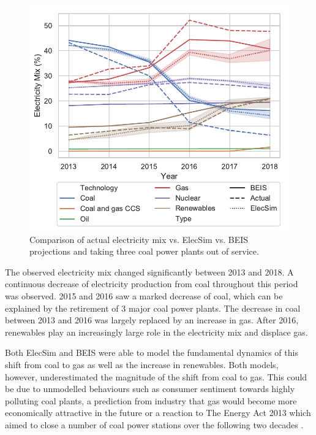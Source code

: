 \begin{figure}
	\centering
	\includegraphics[width=0.7\columnwidth]{Chapter4/figures/e-Energy-2020/results/throughout_years_beis_elecsim_comparison_coal_dropout_leg_below.pdf}
	\caption{Comparison of actual electricity mix vs. ElecSim vs. BEIS projections and taking three coal power plants out of service.}
	\label{elecsim:fig:beis_elecsim_historic_comparison}
\end{figure}

The observed electricity mix changed significantly between 2013 and 2018. A continuous decrease of electricity production from coal throughout this period was observed. 2015 and 2016 saw a marked decrease of coal, which can be explained by the retirement of 3 major coal power plants. The decrease in coal between 2013 and 2016 was largely replaced by an increase in gas. After 2016, renewables play an increasingly large role in the electricity mix and displace gas.

Both ElecSim and BEIS were able to model the fundamental dynamics of this shift from coal to gas as well as the increase in renewables. Both models, however, underestimated the magnitude of the shift from coal to gas. This could be due to unmodelled behaviours such as consumer sentiment towards highly polluting coal plants, a prediction from industry that gas would become more economically attractive in the future or a reaction to The Energy Act 2013 which aimed to close a number of coal power stations over the following two decades \cite{uk_energy_act}.


